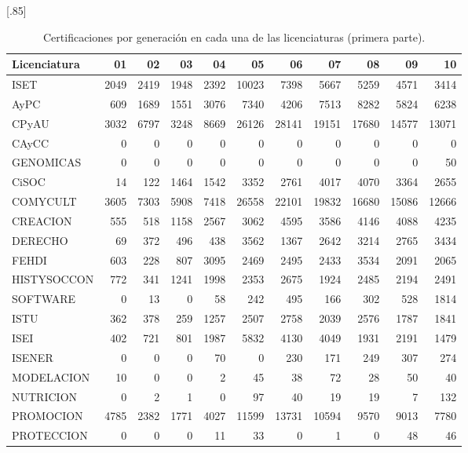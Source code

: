 \documentclass[12pt]{article}
\begin{document}
\begin{table}[ht!]
\centering
\scalebox{0.75}[.85]{
\begin{tabular}{lrrrrrrrrrr}
  \hline\hline
Licenciatura & 01 & 02 & 03 & 04 & 05 & 06 & 07 & 08 & 09 & 10\\ 
  \hline
ISET & 2049 & 2419 & 1948 & 2392 & 10023 & 7398 & 5667 & 5259 & 4571 & 3414 \\ 
  AyPC & 609 & 1689 & 1551 & 3076 & 7340 & 4206 & 7513 & 8282 & 5824 & 6238\\ 
  CPyAU & 3032 & 6797 & 3248 & 8669 & 26126 & 28141 & 19151 & 17680 & 14577 & 13071\\ 
  CAyCC &   0 &   0 &   0 &   0 &   0 &   0 &   0 &   0 &   0 &   0\\ 
  GENOMICAS &   0 &   0 &   0 &   0 &   0 &   0 &   0 &   0 &   0 &  50\\ 
  CiSOC &  14 & 122 & 1464 & 1542 & 3352 & 2761 & 4017 & 4070 & 3364 & 2655\\ 
  COMYCULT & 3605 & 7303 & 5908 & 7418 & 26558 & 22101 & 19832 & 16680 & 15086 & 12666\\ 
  CREACION & 555 & 518 & 1158 & 2567 & 3062 & 4595 & 3586 & 4146 & 4088 & 4235\\ 
  DERECHO &  69 & 372 & 496 & 438 & 3562 & 1367 & 2642 & 3214 & 2765 & 3434\\ 
  FEHDI & 603 & 228 & 807 & 3095 & 2469 & 2495 & 2433 & 3534 & 2091 & 2065\\ 
  HISTYSOCCON & 772 & 341 & 1241 & 1998 & 2353 & 2675 & 1924 & 2485 & 2194 & 2491\\ 
  SOFTWARE &   0 &  13 &   0 &  58 & 242 & 495 & 166 & 302 & 528 & 1814\\ 
  ISTU & 362 & 378 & 259 & 1257 & 2507 & 2758 & 2039 & 2576 & 1787 & 1841\\ 
  ISEI & 402 & 721 & 801 & 1987 & 5832 & 4130 & 4049 & 1931 & 2191 & 1479\\ 
  ISENER &   0 &   0 &   0 &  70 &   0 & 230 & 171 & 249 & 307 & 274\\ 
  MODELACION &  10 &   0 &   0 &   2 &  45 &  38 &  72 &  28 &  50 &  40\\ 
  NUTRICION &   0 &   2 &   1 &   0 &  97 &  40 &  19 &  19 &   7 & 132 \\ 
  PROMOCION & 4785 & 2382 & 1771 & 4027 & 11599 & 13731 & 10594 & 9570 & 9013 & 7780\\ 
  PROTECCION &   0 &   0 &   0 &  11 &  33 &   0 &   1 &   0 &  48 &  46\\ 
   \hline\hline
   \hline
\end{tabular}
}
\caption{\label{Prob_Cert_Lic_Gen_1}Certificaciones por generaci\'on en cada una de las licenciaturas (primera parte).}
\end{table}
\end{document}
